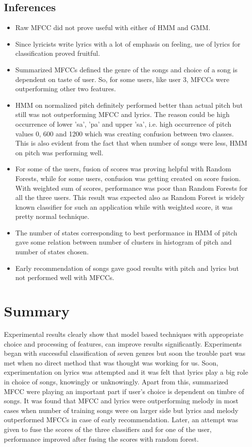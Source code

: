 \subsection{Inferences}
\begin{itemize}
\item Raw MFCC did not prove useful with either of HMM and GMM.
\item Since lyricists write lyrics with a lot of emphasis on feeling, use of lyrics for classification proved fruitful.
\item Summarized MFCCs defined the genre of the songs and choice of a song is dependent on taste of user. So, for some users, like user 3, MFCCs were outperforming other two features.
\item HMM on normalized pitch definitely performed better than actual pitch but still was not outperforming MFCC and lyrics. The reason could be high occurrence of lower 'sa', 'pa' and upper 'sa', i.e. high occurrence of pitch values 0, 600 and 1200 which was creating confusion between two classes. This is also evident from the fact that when number of songs were less, HMM on pitch was performing well.
\item For some of the users, fusion of scores was proving helpful with Random Forests, while for some users, confusion was getting created on score fusion. With weighted sum of scores, performance was poor than Random Forests for all the three users. This result was expected also as Random Forest is widely known classifier for such an application while with weighted score, it was pretty normal technique.
\item The number of states corresponding to best performance in HMM of pitch gave some relation between number of clusters in histogram of pitch and number of states chosen.
\item Early recommendation of songs gave good results with pitch and lyrics but not performed well with MFCCs.  
\end{itemize}
\section{Summary}
Experimental results clearly show that model based techniques with appropriate choice and processing of features, can improve results significantly. Experiments began with successful classification of seven genres but soon the trouble part was met when no direct method that was thought was working for us. Soon, experimentation on lyrics was attempted and it was felt that lyrics play a big role in choice of songs, knowingly or unknowingly. Apart from this, summarized MFCC were playing an important part if user's choice is dependent on timbre of songs. It was found that MFCC and lyrics were outperforming melody in most cases when number of training songs were on larger side but lyrics and melody outperformed MFCCs in case of early recommendation. Later, an attempt was given to fuse the scores of the three classifiers and for one of the user, performance improved after fusing the scores with random forest.